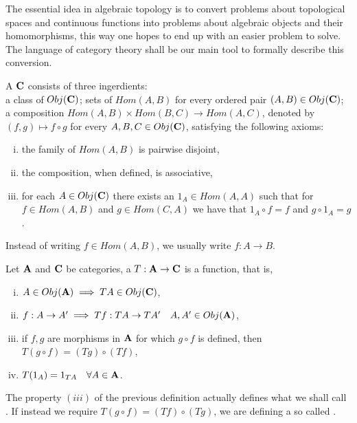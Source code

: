 \documentclass[../1.tex]{subfiles}
\begin{document}
    The essential idea in algebraic topology is to convert problems about topological spaces and continuous functions into
    problems about algebraic objects and their homomorphisms, this way one hopes to end up with an easier problem to solve. 
    The language of category theory shall be our main tool to formally describe this conversion.

    \begin{defn}
        A  $\textbf{C}$ consists of three ingerdients:\\
        a class of  $Obj(\textbf{C})$; sets of 
        $Hom(A,B)$ for every ordered pair $(A,B) \in Obj(\textbf{C})$; a composition $Hom(A,B) \times Hom(B,C) \to Hom(A,C)$, denoted
        by $(f,g) \mapsto f \circ g$ for every $A,B,C \in Obj(\textbf{C})$, satisfying the following axioms:
        \begin{enumerate}[(i)]
            \item the family of $Hom(A,B)$ is pairwise disjoint,
            \item the composition, when defined, is associative,
            \item for each $A \in Obj(\textbf{C})$ there exists an  $1_A \in Hom(A,A)$ such that for $f \in Hom(A,B)$ and $g \in Hom(C,A)$
                  we have that $1_A \circ f = f$ and $g \circ 1_A = g$.
        \end{enumerate}
    \end{defn}

    Instead of writing $f \in Hom(A,B)$, we usually write $f : A \to B$. 

    \begin{defn}
        Let $\textbf{A}$ and $\textbf{C}$ be categories, a  $T : \textbf{A} \to \textbf{C}$ is a function, that is, 
        \begin{enumerate}[(i)]
            \item $A \in Obj(\textbf{A}) \implies TA \in Obj(\textbf{C})$,
            \item $f:A \to A' \implies Tf: TA \to TA' \quad A,A' \in Obj(\textbf{A})$,
            \item if $f,g$ are morphisms in $\textbf{A}$ for which $g \circ f$ is defined, then $T(g \circ f) = (Tg) \circ (Tf)$,
            \item $T(1_A)= 1_{TA} \quad \forall A \in \textbf{A}$.
        \end{enumerate}
    \end{defn}

    The property $(iii)$ of the previous definition actually defines what we shall call .
    If instead we require $T(g \circ f) = (Tf) \circ (Tg)$, we are defining a so called .
\end{document}
